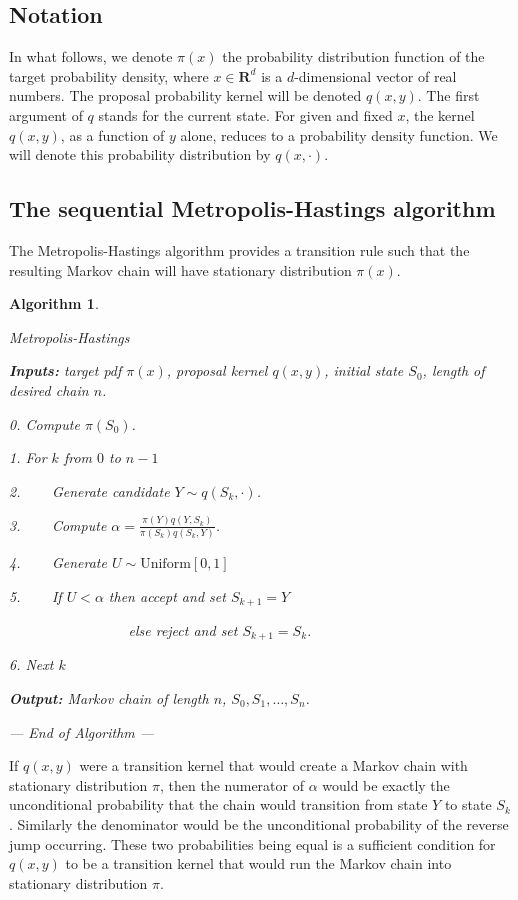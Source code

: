 \documentclass[11pt,letterpaper]{article}       %
\newtheorem{algX}{Algorithm}
\newenvironment{algorithm}       {\begin{algX}\begin{em}}%
                                 {\par\noindent --- End of Algorithm ---
                                 \end{em}\end{algX}}
\newcommand{\step}[2]            {\begin{list}{}
                                  {  \setlength{\topsep}{0cm}
                                     \setlength{\partopsep}{0cm}
                                     \setlength{\leftmargin}{0.8cm}
                                     \setlength{\labelwidth}{0.7cm}
                                     \setlength{\labelsep}{0.1cm}    }
                                  \item[#1]#2    \end{list}}
\begin{document}
\subsection{Notation} 

In what follows, we denote $\pi(x)$ the probability distribution function of
the target probability density, where $x\in\mathbf{R}^d$ is a $d$-dimensional
vector of real numbers.  The proposal probability kernel will be denoted
$q(x,y)$.  The first argument of $q$ stands for the current state.  For given
and fixed $x$, the kernel $q(x,y)$, as a function of $y$ alone, reduces to a
probability density function. We will denote this probability distribution by
$q(x,\cdot)$.

\subsection{The sequential Metropolis-Hastings algorithm} \label{subsect-m-h-sequential}

The Metropolis-Hastings algorithm provides a transition rule such that the 
resulting Markov chain will have stationary distribution $\pi(x)$. 

\begin{algorithm}{Metropolis-Hastings}
\step{\textbf{Inputs:}} { target pdf $\pi(x)$, proposal kernel $q(x,y)$, initial state $S_0$, 
length of desired chain $n$. }
\step{0.} {Compute $\pi(S_0)$.}
\step{1.} {For $k$ from $0$ to $n-1$}
\step{2.} {~~~ Generate candidate $Y \sim q(S_k, \cdot)$.}
\step{3.} {~~~ Compute $\displaystyle \alpha=\frac{\pi(Y)q(Y,S_k)}{\pi(S_k)q(S_k,Y)}$.}
\step{4.} {~~~ Generate $U\sim \mathrm{Uniform}[0,1]$ }
\step{5.} {~~~ If $U<\alpha$ then \emph{accept} and set $S_{k+1}=Y$ }
\step{}   {~~~~~~~~~~~~~~~~ else \emph{reject} and set $S_{k+1}=S_k$. }
\step{6.} {Next $k$ }
\step{\textbf{Output:}} { Markov chain of length $n$, $S_0, S_1, \ldots, S_n$. }
\end{algorithm}

If $q(x,y)$ were a transition kernel that would create a Markov chain with 
stationary distribution $\pi$, then the numerator of $\alpha$ would be exactly the
unconditional probability that the chain would transition from state $Y$ to 
state $S_k$.  Similarly the denominator would be the unconditional probability of
the reverse jump occurring.  These two probabilities being equal is a sufficient
condition for $q(x,y)$ to be a transition kernel that would run the Markov chain
into stationary distribution $\pi$. 
\end{document}
